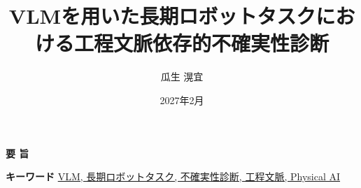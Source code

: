 \documentclass{my_bthesis}
\title{VLMを用いた長期ロボットタスクにおける工程文脈依存的不確実性診断}
\author{瓜生 滉宜}
\date{2027年2月}
\begin{document}
\maketitle

\startabstractpage
{}

\begin{center}
  {\Large \textbf{要 \quad 旨}}
\end{center}



\vspace*{1mm}
\begin{center}
\noindent \textbf{キーワード} \underline{VLM, 長期ロボットタスク, 不確実性診断, 工程文脈, Physical AI}
\end{center}

\newpage

\tableofcontents
\clearpage

\listoffigures
\clearpage

\listoftables
\clearpage

\startmaintext
{}










\appendix




\end{document}
